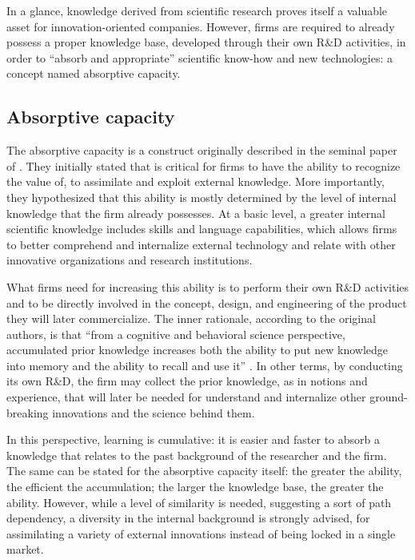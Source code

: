 In a glance, knowledge derived from scientific research proves itself a valuable asset for innovation-oriented companies. However, firms are required to already possess a proper knowledge base, developed through their own R\&D activities, in order to \enquote{absorb and appropriate} scientific know-how and new technologies: a concept named absorptive capacity.

\subsection{Absorptive capacity}

The absorptive capacity is a construct originally described in the seminal paper of \citet{Cohen1990}. They initially stated that is critical for firms to have the ability to recognize the value of, to assimilate and exploit external knowledge. More importantly, they hypothesized that this ability is mostly determined by the level of internal knowledge that the firm already possesses. At a basic level, a greater internal scientific knowledge includes skills and language capabilities, which allows firms to better comprehend and internalize external technology and relate with other innovative organizations and research institutions.

What firms need for increasing this ability is to perform their own R\&D activities and to be directly involved in the concept, design, and engineering of the product they will later commercialize. The inner rationale, according to the original authors, is that \enquote{from a cognitive and behavioral science perspective, accumulated prior knowledge increases both the ability to put new knowledge into memory and the ability to recall and use it} \citep{Cohen1990}. In other terms, by conducting its own R\&D, the firm may collect the prior knowledge, as in notions and experience, that will later be needed for understand and internalize other ground-breaking innovations and the science behind them. 

In this perspective, learning is cumulative: it is easier and faster to absorb a knowledge that relates to the past background of the researcher and the firm. The same can be stated for the absorptive capacity itself: the greater the ability, the efficient the accumulation; the larger the knowledge base, the greater the ability. However, while a level of similarity is needed, suggesting a sort of path dependency, a diversity in the internal background is strongly advised, for assimilating a variety of external innovations instead of being locked in a single market. 

